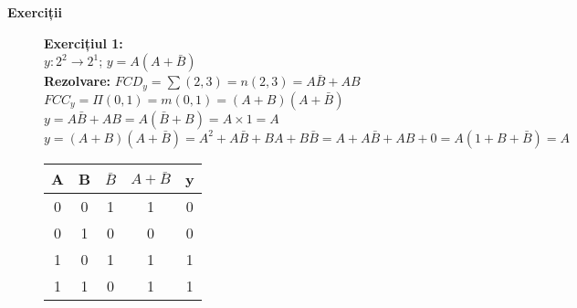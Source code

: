 \documentclass[12pt]{article}
\begin{document}
\begin{center}
    \textbf{Exerciții}
\end{center}

\begin{figure}[h!]
    \begin{minipage}{0.6\textwidth}
        \textbf{Exercițiul 1:\\}
        $y: 2^2 \rightarrow 2^1$;
        $y = A(A + \bar{B})$\\
        \textbf{Rezolvare:}
        $FCD_{y}=\sum(2,3)=n(2,3)=A\bar{B}+AB$\\
        $ FCC_{y}=\Pi(0,1)=m(0,1)=(A+B)(A+\bar{B}) $\\
        $ y= A\bar{B}+AB=A(\bar{B}+B)=A\times1=A$\\
        $y=(A+B)(A+\bar{B})=A^2+A\bar{B}+BA+B\bar{B}=A+A\bar{B}+AB+0=A(1+B+\bar{B})=A$\\
    \end{minipage}
    \hfill
    \begin{minipage}{0.35\textwidth}
        \begin{tabular}{|c|c|c|c|c|}
            \hline
            A & B & $\bar{B}$ & $A+\bar{B}$ & y \\ \hline
            0 & 0 & 1 & 1 & 0 \\ \hline
            0 & 1 & 0 & 0 & 0 \\ \hline
            1 & 0 & 1 & 1 & 1 \\ \hline
            1 & 1 & 0 & 1 & 1 \\ \hline
        \end{tabular}
    \end{minipage}
\end{figure}
\end{document}
